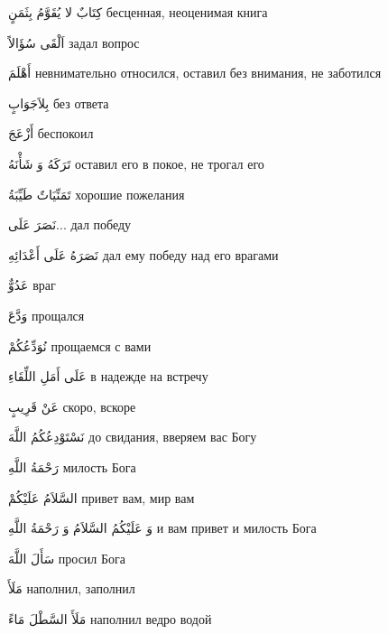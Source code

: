 \documentclass[a5paper]{article}
\newcommand\textstyleDropCaps[1]{#1}
\newcommand\textstyleCaptioncharacters[1]{#1}
\begin{document}
\textstyleCaptioncharacters{كِتَابٌ لا يُقَوَّمُ بِثَمَنٍ }\textstyleDropCaps{бесценная, неоценимая книга‎}

\textstyleCaptioncharacters{اَلْقَى سُؤَالاً }\textstyleDropCaps{задал вопрос‎}

\textstyleCaptioncharacters{أَهْلَمَ }\textstyleDropCaps{невнимательно отно­сился, оставил без внимания, не заботился‎}

\textstyleCaptioncharacters{بِلاَجَوَابٍ }\textstyleDropCaps{без ответа‎}

\textstyleCaptioncharacters{أَزْعَجَ }\textstyleDropCaps{беспокоил‎}

\textstyleCaptioncharacters{تَرَكَهُ وَ شَأْنَهُ }\textstyleDropCaps{оставил его в покое, не трогал его‎}

\textstyleCaptioncharacters{تَمَنِّيَاتٌ طَيِّبَةُ }\textstyleDropCaps{хоро­шие пожелания‎}

\textstyleCaptioncharacters{نَصَرَ عَلَى...ِ }\textstyleDropCaps{дал победу‎}

\textstyleCaptioncharacters{نَصَرَهُ عَلَى أَعْدَائِهِ }\textstyleDropCaps{дал ему победу над его врагами‎}

\textstyleCaptioncharacters{عَدُوٌّ }\textstyleDropCaps{враг‎}

\textstyleCaptioncharacters{وَدَّعَ }\textstyleDropCaps{прощался‎}

\textstyleCaptioncharacters{نُوَدِّعُكُمْ }\textstyleDropCaps{прощаемся с вами‎}

\textstyleCaptioncharacters{عَلَى أَمَلِ اللِّقَاءِ }\textstyleDropCaps{в наде­жде на встречу‎}

\textstyleCaptioncharacters{عَنْ قَرِيبٍ }\textstyleDropCaps{скоро, вскоре‎}

\textstyleCaptioncharacters{نَسْتَوْدِعُكُمُ اللَّهَ }\textstyleDropCaps{до сви­дания, вверяем вас Богу‎}

\textstyleCaptioncharacters{رَحْمَةُ اللَّهِ }\textstyleDropCaps{милость Бога‎}

\textstyleCaptioncharacters{السَّلاَمُ عَلَيْكُمْ }\textstyleDropCaps{привет вам, мир вам‎}

\textstyleCaptioncharacters{وَ عَلَيْكُمُ السَّلاَمُ وَ رَحْمَةُ اللَّهِ }\textstyleDropCaps{и вам привет и милость Бога‎}

\textstyleCaptioncharacters{سَأَلَ اللَّهَ }\textstyleDropCaps{просил Бога‎}

\textstyleCaptioncharacters{مَلَأَ }\textstyleDropCaps{наполнил, заполнил‎}

\textstyleCaptioncharacters{مَلَأَ السَّطْلَ مَاءً }\textstyleDropCaps{напол­нил ведро водой‎}
\end{document}
